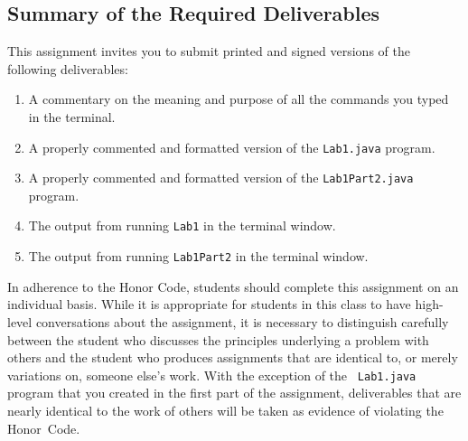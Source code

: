\subsection*{Summary of the Required Deliverables}

This assignment invites you to submit printed and signed versions of the following deliverables: 

\begin{enumerate}
  \setlength{\itemsep}{.01in}
  \item A commentary on the meaning and purpose of all the commands you typed in the terminal.
  \item A properly commented and formatted version of the {\tt Lab1.java} program.
  \item A properly commented and formatted version of the {\tt Lab1Part2.java} program.
  \item The output from running {\tt Lab1} in the terminal window.
  \item The output from running {\tt Lab1Part2} in the terminal window.
\end{enumerate}

In adherence to the Honor Code, students should complete this assignment on an individual basis. While it is appropriate
for students in this class to have high-level conversations about the assignment, it is necessary to distinguish
carefully between the student who discusses the principles underlying a problem with others and the student who produces
assignments that are identical to, or merely variations on, someone else's work.  With the exception of the {\tt
  Lab1.java} program that you created in the first part of the assignment, deliverables that are nearly identical to the
work of others will be taken as evidence of violating the \mbox{Honor Code}.  



